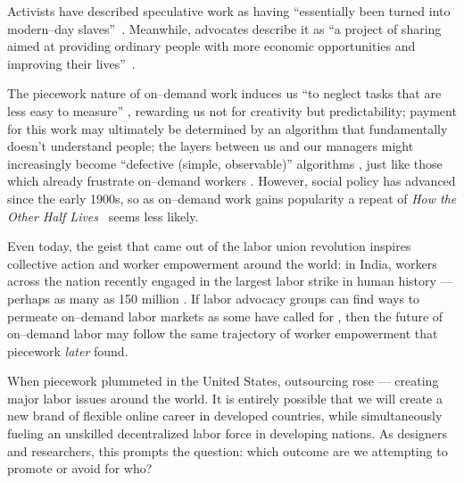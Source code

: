 \documentclass[trackingWork]{subfiles}
\begin{document}
Activists have described speculative work as having
``essentially been turned into modern--day slaves''~\cite{activistsHuffPoLawsuit}.
Meanwhile, advocates describe it as
``a project of sharing
aimed at providing ordinary people
with more economic opportunities and
improving their lives''~\cite{uberPropaganda}.

The piecework nature of on--demand work induces us
``to neglect tasks that are less easy to measure'' \cite{SJOE:SJOE371},
rewarding us not for creativity but predictability;
payment for this work may ultimately be determined by
an algorithm that fundamentally doesn't understand people;
the layers between us and our managers might increasingly become
``defective (simple, observable)'' algorithms \cite{10.2307/2555446},
just like those which already frustrate
on--demand workers
\cite{uberAlgorithm,dynamo,turkopticon}.
However, social policy has advanced since the early 1900s, so as on--demand work gains popularity a repeat of \textit{How the Other Half Lives}~\cite{riisOtherSideLives} seems less likely.

Even today, the geist that came out of the labor union revolution
inspires collective action and worker empowerment around the world:
in India, workers across the nation recently engaged in
the largest labor strike in human history
--- perhaps as many as 150 million
\cite{indiaStrikeRealNews}.
If labor advocacy groups can find ways to permeate on--demand labor markets as some have called for
\cite{futureUnions},
then the future of on--demand labor may follow
the same trajectory of worker empowerment that piecework \textit{later} found.


When piecework plummeted in the United States, outsourcing rose --- creating major labor issues around the world.
It is entirely possible that we will create a new brand of flexible online career in developed countries, while simultaneously fueling an unskilled decentralized labor force in developing nations.
As designers and researchers, this prompts the question: which outcome are we attempting to promote or avoid for who?
\end{document}
